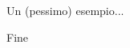 \documentclass[xcolor=dvipsnames,aspectratio=169]{beamer}
\begin{document}
\begin{frame}{Un (pessimo) esempio...}
    \pause

  \begin{figure}%
    \centering
  \pause
    \qquad
  \end{figure}

\end{frame}
\begin{frame}{Fine}

\end{frame}
\end{document}

